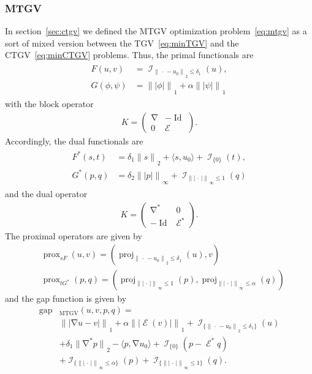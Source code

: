 \documentclass[twocolumn,envcountsame]{svjour3}
\newcommand{\norm}[2][]{{\|{#2}\|_{}}_{#1}}
\newcommand{\abs}[1]{|#1|}
\newcommand{\scp}[2]{\langle #1,#2\rangle}
\newcommand{\dummy}{\,\cdot\,}
\newcommand{\pmat}[1]{\begin{pmatrix} #1 \end{pmatrix}}
\DeclareMathOperator{\id}{Id}
\DeclareMathOperator{\ind}{\mathcal{I}}
\DeclareMathOperator{\prox}{prox}
\DeclareMathOperator{\proj}{proj}
\DeclareMathOperator{\gap}{gap}
\DeclareMathOperator{\grad}{\nabla}
\DeclareMathOperator{\symgrad}{\mathcal{E}}
\begin{document}
\subsubsection{MTGV}
\label{sec:dualmtgv}
%
In section~\ref{sec:ctgv} we defined the MTGV optimization 
problem~\eqref{eq:mtgv} as a sort of mixed version between the 
TGV~\eqref{eq:minTGV} and the CTGV~\eqref{eq:minCTGV} problems. Thus, 
the primal functionals are
\begin{align}\label{eq:primalmtgv}
\begin{split}
	F(u,v) &= \ind_{\norm[2]{\dummy - u_0}\leq \delta_1}(u),\\
	G(\phi, \psi) &= \norm[1]{\abs{\phi}} + \alpha
				\norm[1]{\abs{\psi}}
\end{split}
\end{align}
with the block operator
\begin{align}\label{eq:operatormtgv}
  K = \pmat{\grad & -\id\\0 &\symgrad}.
\end{align}
Accordingly, the dual functionals are
\begin{align}\label{eq:dualmtgv}
\begin{split}
	F^*(s,t) &= \delta_1\norm[2]{s} + \scp{s}{u_0}
			+ \ind_{\{0\}}(t),\\
	G^*(p,q) &= \delta_2\norm[\infty]{\abs{p}}
			+ \ind_{\norm[\infty]{\abs{\dummy}}\leq 1}(q)
\end{split}
\end{align}
and the dual operator
\begin{align}\label{eq:dualoperatormtgv}
  K = \pmat{\grad^* & 0\\-\id &\symgrad^*}.
\end{align}
%
The proximal operators are given by 
\begin{align*}
	&\prox_{s F}(u,v)=(\proj_{\norm[2]{\dummy-u_0}\leq \delta_1}(u),v)\\
	&\prox_{t G^*}(p,q)=(\proj_{\norm[\infty]{\abs{\dummy}}\leq
	1}(p),\proj_{\norm[\infty]{\abs{\dummy}}\leq \alpha}(q))
\end{align*}
and the gap function is given by
\begin{align*}
     \gap&_{\operatorname{MTGV}}(u,v,p,q)=\\
   &\norm[1]{\abs{\grad u - v}} + 
		\alpha\norm[1]{\abs{\symgrad(v)}}
		+\ind_{\{\norm[2]{\dummy -u_0}\leq \delta_1\}}(u)\\
		&+\delta_1\norm[2]{\grad^* p} - \langle p, \grad u_0\rangle 
		+\ind_{\{0\}}(p - \symgrad^*q) \\
		&+\ind_{\{\norm[\infty]{\abs{\dummy}}\leq\alpha\}}(p) +
		\ind_{\{\norm[\infty]{\abs{\dummy}}\leq 1\}}(q).
     \end{align*}
\end{document}
